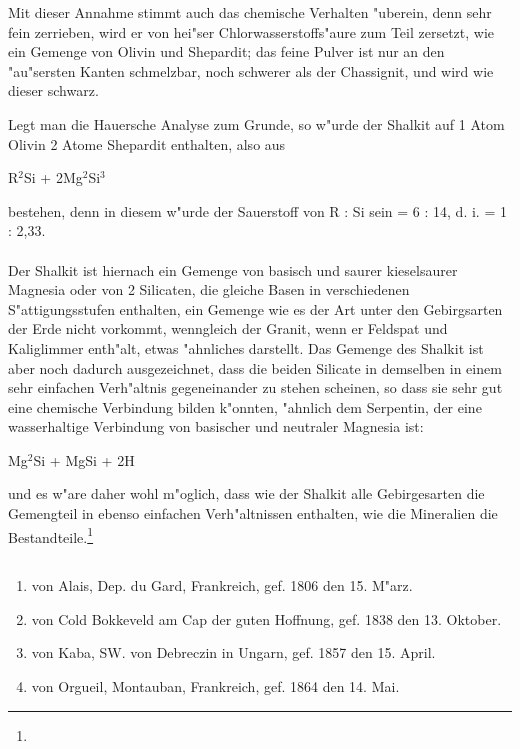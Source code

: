 \documentclass[a4paper, 11pt, oneside]{article}
\begin{document}
Mit dieser Annahme stimmt auch das chemische Verhalten "uberein, denn sehr fein zerrieben, wird er von hei"ser Chlorwasserstoffs"aure zum Teil zersetzt, wie ein Gemenge von Olivin und Shepardit; das feine Pulver ist nur an den "au"sersten Kanten schmelzbar, noch schwerer als der Chassignit, und wird wie dieser schwarz.

Legt man die Hauersche Analyse zum Grunde, so w"urde der Shalkit auf 1 Atom Olivin 2 Atome Shepardit enthalten, also aus
\begin{center}
R$^{2}$Si + 2Mg$^{2}$Si$^{3}$
\end{center}
bestehen, denn in diesem w"urde der Sauerstoff von R : Si sein = 6 : 14, d. i. = 1 : 2,33.
\paragraph{}
Der Shalkit ist hiernach ein Gemenge von basisch und saurer kieselsaurer Magnesia oder von 2 Silicaten, die gleiche Basen in verschiedenen S"attigungsstufen enthalten, ein Gemenge wie es der Art unter den Gebirgsarten der Erde nicht vorkommt, wenngleich der Granit, wenn er Feldspat und Kaliglimmer enth"alt, etwas "ahnliches darstellt. Das Gemenge des Shalkit ist aber noch dadurch ausgezeichnet, dass die beiden Silicate in demselben in einem sehr einfachen Verh"altnis gegeneinander zu stehen scheinen, so dass sie sehr gut eine chemische Verbindung bilden k"onnten, "ahnlich dem Serpentin, der eine wasserhaltige Verbindung von basischer und neutraler Magnesia ist:
\begin{center}
Mg$^{2}$Si + MgSi + 2H
\end{center}
und es w"are daher wohl m"oglich, dass wie der Shalkit alle Gebirgesarten die Gemengteil in ebenso einfachen Verh"altnissen enthalten, wie die Mineralien die Bestandteile.\footnote{}
\subsection{}
\begin{enumerate}
    \item von Alais, Dep. du Gard, Frankreich, gef. 1806 den 15. M"arz.
    \item von Cold Bokkeveld am Cap der guten Hoffnung, gef. 1838 den 13. Oktober.
    \item von Kaba, SW. von Debreczin in Ungarn, gef. 1857 den 15. April.
    \item von Orgueil, Montauban, Frankreich, gef. 1864 den 14. Mai.
\end{enumerate}
\end{document}
